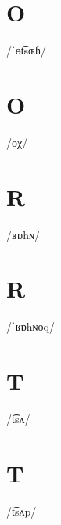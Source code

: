 \documentclass[10pt,a4paper,twoside]{book}
\begin{document}
\section*{O}

\begin{multicols}{3}
 {/ˈɵt͡sɶɦ/} {}
\end{multicols}

\section*{O}

\begin{multicols}{3}
 {/ɵχ/} {}
\end{multicols}

\section*{R}

\begin{multicols}{3}
 {/ʁɒhɴ/} {}
\end{multicols}

\section*{R}

\begin{multicols}{3}
 {/ˈʁɒhɴɵq/} {}
\end{multicols}

\section*{T}

\begin{multicols}{3}
 {/t͡sʌ/} {}
\end{multicols}

\section*{T}

\begin{multicols}{3}
 {/t͡sʌp/} {}
\end{multicols}
\end{document}
